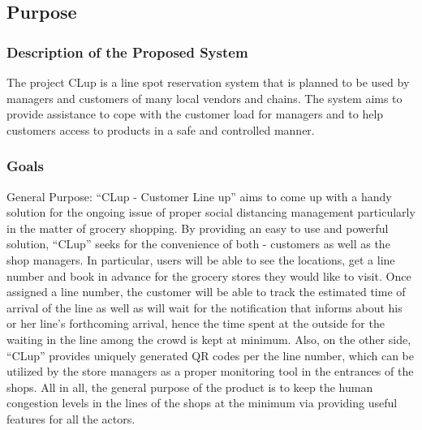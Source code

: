 \subsection{Purpose}

\subsubsection{Description of the Proposed System}
The project CLup is a line spot reservation system that is planned to be used by managers and customers of many local vendors and chains.
The system aims to provide assistance to cope with the customer load for managers and to help customers access to products in a safe and controlled manner.

\subsubsection{Goals}

General Purpose:
      “CLup - Customer Line up” aims to come up with a handy solution for the ongoing issue of proper social distancing management particularly in the matter of grocery shopping. By providing an easy to use and powerful solution, “CLup” seeks for the convenience of both - customers as well as the shop managers. In particular, users will be able to see the locations, get a line number and book in advance for the grocery stores they would like to visit. Once assigned a line number, the customer will be able to track the estimated time of arrival of the line as well as will wait for the notification that informs about his or her line’s forthcoming arrival, hence the time spent at the outside for the waiting in the line among the crowd is kept at minimum. Also, on the other side, “CLup” provides uniquely generated QR codes per the line number, which can be utilized by the store managers as a proper monitoring tool in the entrances of the shops. All in all, the general purpose of the product is to keep the human congestion levels in the lines of the shops at the minimum via providing useful features for all the actors.

